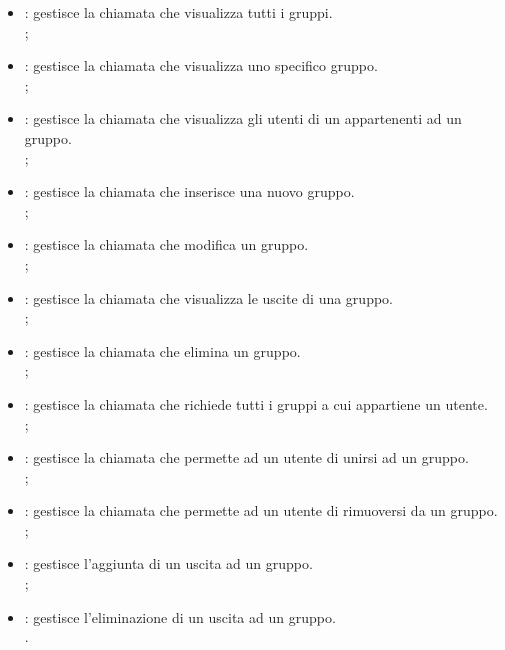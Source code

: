 \begin{itemize}
    \item {}: gestisce la chiamata che visualizza tutti i gruppi.\\ ;
    \item {}:  gestisce la chiamata che visualizza uno specifico gruppo. \\ ;
    \item {}: gestisce la chiamata che visualizza gli utenti di un appartenenti ad un gruppo. \\ ;
    \item {}: gestisce la chiamata che inserisce una nuovo gruppo. \\ ;
    \item {}: gestisce la chiamata che modifica un gruppo.\\ ;
    \item {}: gestisce la chiamata che visualizza le uscite di una gruppo.\\ ;
    \item {}: gestisce la chiamata che elimina un gruppo. \\ ;
    \item {}: gestisce la chiamata che richiede tutti i gruppi a cui appartiene un utente. \\ ;
    \item {}: gestisce la chiamata che permette ad un utente di unirsi ad un gruppo. \\ ;
    \item {}: gestisce la chiamata che permette ad un utente di rimuoversi da un gruppo. \\ ;
    \item {}:  gestisce l'aggiunta di un uscita ad un gruppo. \\ ;
    \item {}: gestisce l'eliminazione di un uscita ad un gruppo. \\ .  
\end{itemize}



